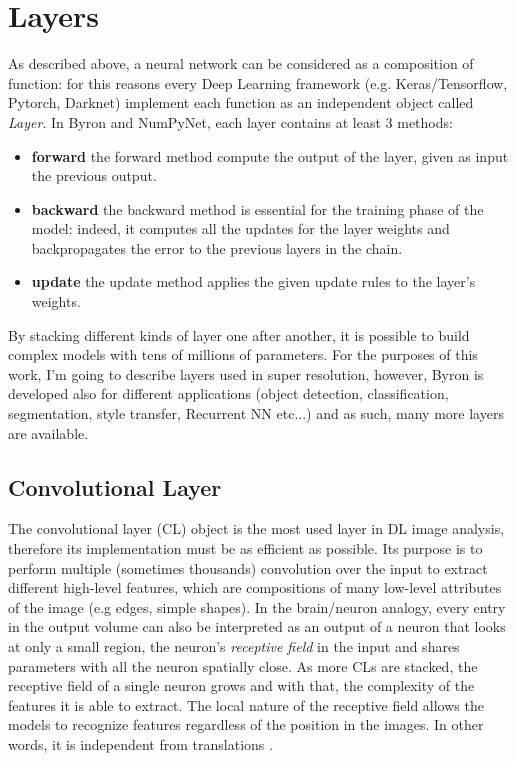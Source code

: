 \documentclass[12pt,a4paper]{report}
\begin{document}
\section{Layers}

As described above, a neural network can be considered as a composition of function: for this reasons every Deep Learning framework (e.g. Keras/Tensorflow, Pytorch, Darknet) implement each function as an independent object called {\it Layer}. In Byron and NumPyNet, each layer contains at least 3 methods:
\begin{itemize}
 \setlength\itemsep{-0.3em}
 \item {\bf forward} the forward method compute the output of the layer, given as input the previous output. 
 \item {\bf backward} the backward method is essential for the training phase of the model: indeed, it computes all the updates for the layer weights and backpropagates the error to the previous layers in the chain.
 \item {\bf update} the update method applies the given update rules to the layer's weights.
\end{itemize}
By stacking different kinds of layer one after another, it is possible to build 
complex models with tens of millions of parameters. 
For the purposes of this work, I'm going to describe layers used in super resolution, however, Byron is developed also for different applications (object detection, classification, segmentation, style transfer, Recurrent NN etc...) and as such, many more layers are available.   

\subsection*{Convolutional Layer}

The convolutional layer (CL) object is the most used layer in DL image analysis, therefore its implementation must be as efficient as possible.
Its purpose is to perform multiple (sometimes thousands) convolution over the input to extract different high-level features, which are compositions of many low-level attributes of the image (e.g edges, simple shapes).
In the brain/neuron analogy, every entry in the output volume can also be interpreted as an output of a neuron that looks at only a small region, the neuron's {\it receptive field} in the input and shares parameters with all the neuron spatially close.
As more CLs are stacked, the receptive field of a single neuron grows and with that, the complexity of the features it is able to extract.
The local nature of the receptive field allows the models to recognize features regardless of the position in the images. In other words, it is independent from translations \cite{Goodfellow-et-al-2016}. 
\end{document}

